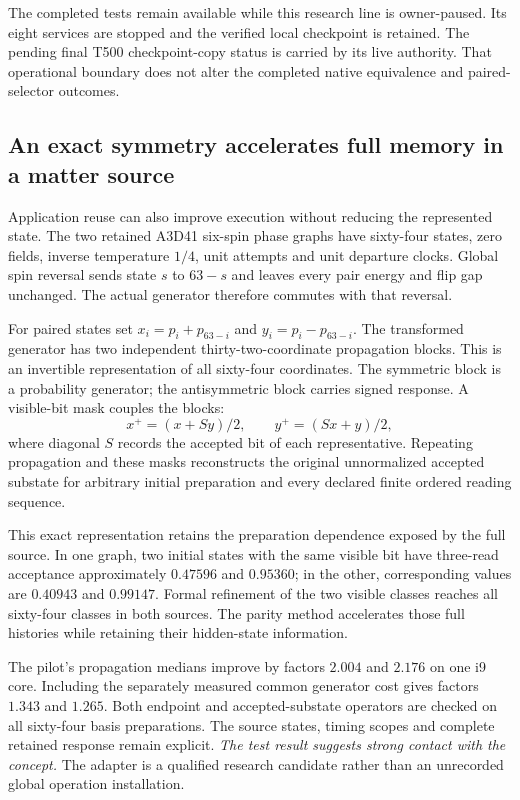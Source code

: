 The completed tests remain available while this research line is owner-paused. Its eight services are stopped and the verified local checkpoint is retained. The pending final T500 checkpoint-copy status is carried by its live authority. That operational boundary does not alter the completed native equivalence and paired-selector outcomes.

\subsection{An exact symmetry accelerates full memory in a matter source}

Application reuse can also improve execution without reducing the represented state. The two retained A3D41 six-spin phase graphs have sixty-four states, zero fields, inverse temperature $1/4$, unit attempts and unit departure clocks. Global spin reversal sends state $s$ to $63-s$ and leaves every pair energy and flip gap unchanged. The actual generator therefore commutes with that reversal. 

For paired states set $x_i=p_i+p_{63-i}$ and $y_i=p_i-p_{63-i}$. The transformed generator has two independent thirty-two-coordinate propagation blocks. This is an invertible representation of all sixty-four coordinates. The symmetric block is a probability generator; the antisymmetric block carries signed response. A visible-bit mask couples the blocks:
\[
 x^+=(x+Sy)/2,\qquad y^+=(Sx+y)/2,
\]
where diagonal $S$ records the accepted bit of each representative. Repeating propagation and these masks reconstructs the original unnormalized accepted substate for arbitrary initial preparation and every declared finite ordered reading sequence.

This exact representation retains the preparation dependence exposed by the full source. In one graph, two initial states with the same visible bit have three-read acceptance approximately $0.47596$ and $0.95360$; in the other, corresponding values are $0.40943$ and $0.99147$. Formal refinement of the two visible classes reaches all sixty-four classes in both sources. The parity method accelerates those full histories while retaining their hidden-state information.

The pilot's propagation medians improve by factors $2.004$ and $2.176$ on one i9 core. Including the separately measured common generator cost gives factors $1.343$ and $1.265$. Both endpoint and accepted-substate operators are checked on all sixty-four basis preparations. The source states, timing scopes and complete retained response remain explicit. \emph{The test result suggests strong contact with the concept.} The adapter is a qualified research candidate rather than an unrecorded global operation installation.

